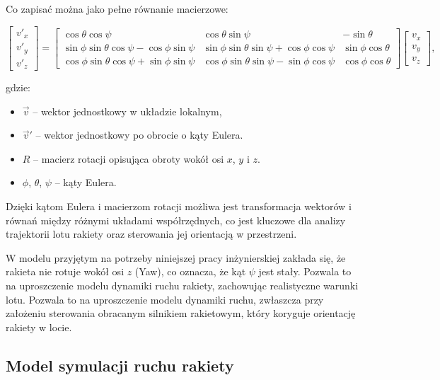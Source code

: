 Co zapisać można jako pełne równanie macierzowe:

\begin{equation}
\begin{bmatrix}
v'_x \\
v'_y \\
v'_z
\end{bmatrix}
=
\begin{bmatrix}
\cos\theta \cos\psi & \cos\theta \sin\psi & -\sin\theta \\
\sin\phi \sin\theta \cos\psi - \cos\phi \sin\psi & \sin\phi \sin\theta \sin\psi + \cos\phi \cos\psi & \sin\phi \cos\theta \\
\cos\phi \sin\theta \cos\psi + \sin\phi \sin\psi & \cos\phi \sin\theta \sin\psi - \sin\phi \cos\psi & \cos\phi \cos\theta
\end{bmatrix}
\begin{bmatrix}
v_x \\
v_y \\
v_z
\end{bmatrix},
\label{eq:full_rotation_matrix}
\end{equation}

gdzie:
\begin{itemize}
    \item $\vec{v}$ -- wektor jednostkowy w układzie lokalnym,
    \item $\vec{v}'$ -- wektor jednostkowy po obrocie o kąty Eulera.
    \item $R$ -- macierz rotacji opisująca obroty wokół osi $x$, $y$ i $z$.
    \item $\phi$, $\theta$, $\psi$ -- kąty Eulera.
\end{itemize}

Dzięki kątom Eulera i macierzom rotacji możliwa jest transformacja wektorów i równań między różnymi układami współrzędnych, co jest kluczowe dla analizy trajektorii lotu rakiety oraz sterowania jej orientacją w przestrzeni.

W modelu przyjętym na potrzeby niniejszej pracy inżynierskiej zakłada się,
że rakieta nie rotuje wokół osi $z$ (Yaw), co oznacza, że kąt $\psi$ jest
stały. Pozwala to na uproszczenie modelu dynamiki ruchu rakiety, zachowując
realistyczne warunki lotu. Pozwala to na uproszczenie modelu dynamiki ruchu,
zwłaszcza przy założeniu sterowania obracanym silnikiem rakietowym, który
koryguje orientację rakiety w locie.

\subsection{Model symulacji ruchu rakiety}

